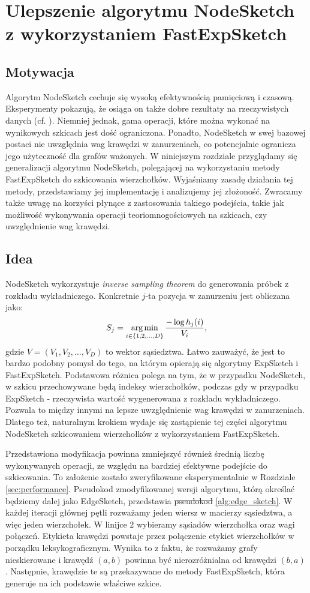 \chapter{Ulepszenie algorytmu NodeSketch z wykorzystaniem FastExpSketch}
\section{Motywacja}
    Algorytm NodeSketch cechuje się wysoką efektywnością pamięciową i czasową. Eksperymenty pokazują, że osiąga on także dobre rezultaty na rzeczywistych danych (cf. \cite{Yang_Rosso_Li_Cudre-Mauroux_2019}). 
    Niemniej jednak, gama operacji, które można wykonać na wynikowych szkicach jest dość ograniczona. Ponadto, NodeSketch w swej bazowej postaci nie uwzględnia wag krawędzi w zanurzeniach, co potencjalnie ogranicza jego użyteczność dla grafów ważonych.   
    W niniejszym rozdziale przyglądamy się generalizacji algorytmu NodeSketch, polegającej na wykorzystaniu metody FastExpSketch do szkicowania wierzchołków. Wyjaśniamy zasadę działania tej metody, przedstawiamy jej implementację i analizujemy jej złożoność. Zwracamy także uwagę na korzyści płynące z zastosowania takiego podejścia, takie jak możliwość wykonywania operacji teoriomnogościowych na szkicach, czy uwzględnienie wag krawędzi.

\section{Idea}
    NodeSketch wykorzystuje \textit{inverse sampling theorem} do generowania próbek z rozkładu wykładniczego. Konkretnie $j$-ta pozycja w zanurzeniu jest obliczana jako: 
    \[  
        S_j = \operatorname*{arg\,min}_{i \in \{1,2,\dots, D\}} \frac{-\log h_{j}(i)}{V_i},
    \] 
    gdzie $V = (V_1, V_2, \dots, V_D)$ to wektor sąsiedztwa. Łatwo zauważyć, że jest to bardzo podobny pomysł do tego, na którym opierają się algorytmy ExpSketch i FastExpSketch. Podstawowa różnica polega na tym, że w przypadku NodeSketch, w szkicu przechowywane będą indeksy wierzchołków, podczas gdy w przypadku ExpSketch - rzeczywista wartość wygenerowana z rozkładu wykładniczego. Pozwala to między innymi na lepsze uwzględnienie wag krawędzi w zanurzeniach. Dlatego też, naturalnym krokiem wydaje się zastąpienie tej części algorytmu NodeSketch szkicowaniem wierzchołków z wykorzystaniem FastExpSketch.

    Przedstawiona modyfikacja powinna zmniejszyć również średnią liczbę wykonywanych operacji, ze względu na bardziej efektywne podejście do szkicowania. To założenie zostało zweryfikowane eksperymentalnie w Rozdziale \ref{sec:performance}. Pseudokod zmodyfikowanej wersji algorytmu, którą określać będziemy dalej jako EdgeSketch, przedstawia \sout{pseudokod}  \ref{alg:edge_sketch}. W każdej iteracji głównej pętli rozważamy jeden wiersz w macierzy sąsiedztwa, a więc jeden  wierzchołek. W linijce $2$ wybieramy sąsiadów wierzchołka oraz wagi połączeń. Etykieta krawędzi powstaje przez połączenie etykiet wierzchołków w porządku leksykograficznym. Wynika to z faktu, że rozważamy grafy nieskierowane i krawędź $(a,b)$ powinna być nierozróżnialna od krawędzi $(b,a)$. Następnie, krawędzie te są przekazywane do metody FastExpSketch, która generuje na ich podstawie właściwe szkice.  

